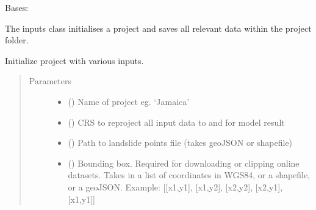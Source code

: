 \documentclass[letterpaper,10pt,english]{sphinxmanual}
\begin{document}
\begin{fulllineitems}
\label{\detokenize{lhat:lhat.IO.inputs}}
Bases: 

The inputs class initialises a project and saves all relevant data within
the project folder.

Initialize project with various inputs.
\begin{quote}\begin{description}
\item[{Parameters}] \leavevmode\begin{itemize}
\item {} 
 () \textendash{} Name of project eg. ‘Jamaica’

\item {} 
 () \textendash{} CRS to reproject all input data to and for model result

\item {} 
 () \textendash{} Path to landslide points file (takes geoJSON or shapefile)

\item {} 
 () \textendash{} Bounding box. Required for downloading or clipping online datasets.
Takes in a list of coordinates in WGS84, or a shapefile, or a geoJSON.
Example: {[}{[}x1,y1{]}, {[}x1,y2{]}, {[}x2,y2{]}, {[}x2,y1{]}, {[}x1,y1{]}{]}


\end{itemize}
\end{description}
\end{quote}
\end{fulllineitems}
\end{document}
